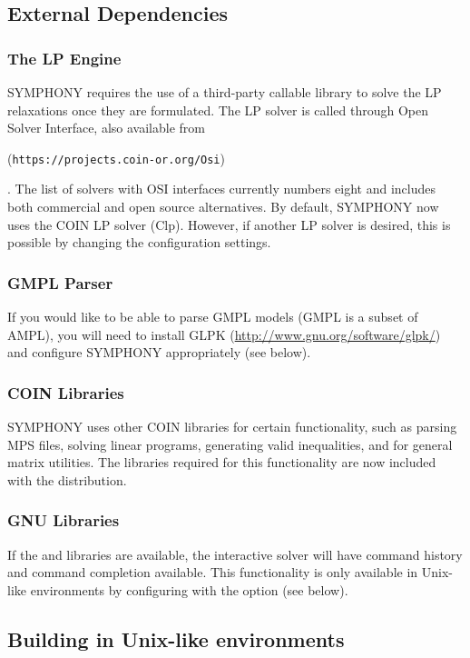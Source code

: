 \subsection{External Dependencies}

\subsubsection{The LP Engine} SYMPHONY requires the use of a third-party
  callable library to solve the LP relaxations once they are formulated. The
LP solver is called through Open Solver Interface, also available from
\begin{latexonly} 
(\texttt{https://projects.coin-or.org/Osi})
\end{latexonly}.
The list of solvers with OSI interfaces currently numbers eight and includes
both commercial and open source alternatives. By default, SYMPHONY now uses
the COIN LP solver (Clp). However, if another LP solver is desired, this is
possible by changing the configuration settings.

\subsubsection{GMPL Parser} If you would like to be able to parse GMPL models
(GMPL is a subset of AMPL), you will need to install GLPK
(\url{http://www.gnu.org/software/glpk/}) and configure SYMPHONY appropriately
(see below).

\subsubsection{COIN Libraries} SYMPHONY uses other COIN libraries for certain
functionality, such as parsing MPS files, solving linear programs, generating
valid inequalities, and for general matrix utilities. The libraries required
for this functionality are now included with the distribution.

\subsubsection{GNU Libraries} If the  and  libraries
are available, the interactive solver will have command history and command
completion available. This functionality is only available in Unix-like
environments by configuring with the  option (see
below).

\subsection{Building in Unix-like environments}
\label{getting_started_unix}

